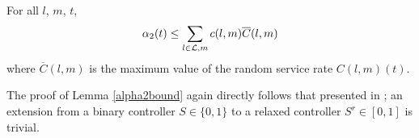 \begin{Lem} \label{alpha2bound}
For all $l$, $m$, $t$, 
\begin{equation} \label{a2eqn}
\alpha_2 (t) \leq \sum_{l \in \linkset,m} c(l,m)\overline{C} (l,m)
\end{equation}
where $\overline{C} (l,m)$ is the maximum value of the random service rate $C(l,m)(t)$. 
\end{Lem}
The proof of Lemma \ref{alpha2bound} again directly follows that presented in \cite{MaxPressureStochastic}; an extension from a binary controller $S\in \{0,1\}$ to a relaxed controller $S^r\in [0,1]$ is trivial. 

